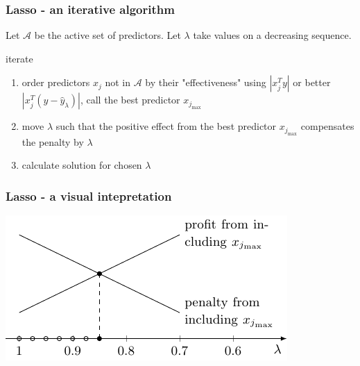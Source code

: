 \documentclass{beamer}
\newcommand{\norm}[1]{\left\lvert#1\right\rvert}
\begin{document}
\begin{frame}
\frametitle{Lasso - an iterative algorithm}
Let $\mathcal{A}$ be the active set of predictors. Let $\lambda$ take values on a decreasing sequence.

\vspace{15pt}

iterate

\begin{enumerate}
	\item order predictors $x_j$ not in $\mathcal{A}$ by their "effectiveness" using $\norm{x_j^Ty}$ or better $\norm{x_j^T(y-\hat{y}_{\lambda})}$, call the best predictor $x_{j_{\max}}$
	\item move $\lambda$ such that the positive effect from the best predictor $x_{j_{\max}}$ compensates the penalty by $\lambda$
	\item calculate solution for chosen $\lambda$
\end{enumerate}

\end{frame}


\begin{frame}
\frametitle{Lasso - a visual intepretation}

\includegraphics[width=\linewidth]{img/lassodifferentperspective.pdf}

\end{frame}
\end{document}

